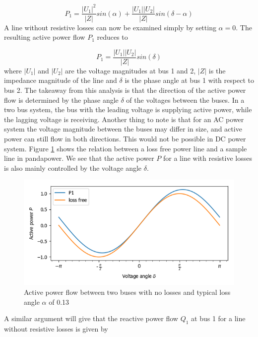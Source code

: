 \documentclass[class=book, crop=false]{standalone}
\begin{document}
\begin{equation}\label{eq:two_port_active_power_good}
P_{1} = \frac{|U_{1}|^2}{|Z|}sin(\alpha) + \frac{|U_{1}||U_{2}|}{|Z|}sin(\delta -\alpha)
\end{equation}
A line without resistive losses can now be examined simply by setting $\alpha = 0$. The resulting active power flow $P_{1}$ reduces to

\begin{equation}\label{eq:two_port_active_power_lossless}
P_{1} =  \frac{|U_{1}||U_{2}|}{|Z|}sin(\delta)
\end{equation}
where $|U_{1}|$ and $|U_{2}|$ are the voltage magnitudes at bus 1 and 2, $|Z|$ is the impedance magnitude of the line and $\delta$ is the phase angle at bus 1 with respect to bus 2. The takeaway from this analysis is that the direction of the active power flow is determined by the phase angle $\delta$ of the voltages between the buses. In a two bus system, the bus with the leading voltage is supplying active power, while the lagging voltage is receiving. Another thing to note is that for an AC power system the voltage magnitude between the buses may differ in size, and active power can still flow in both directions. This would not be possible in DC power system. Figure \ref{fig:theory:active_power_flow} shows the relation between a loss free power line and a sample line in pandapower. We see that the active power $P$ for a line with resistive losses is also mainly controlled by the voltage angle $\delta$.

\begin{figure}[ht!]
    \center
    \includegraphics[width=12cm]{figures/active_power_flow.png}
    \caption[size = 9]{Active power flow between two buses with no losses and typical loss angle $\alpha$ of 0.13}
	\label{fig:theory:active_power_flow}
\end{figure}

A similar argument will give that the reactive power flow $Q_{1}$ at bus 1 for a line without resistive losses is given by 
\end{document}
